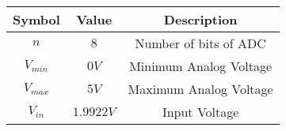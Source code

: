 \begin{tabular}{|c|c|c|}
    \hline
       \textbf{Symbol}  & \textbf{Value} & \textbf{Description}\\
    \hline
        $n$  &  $8$ &  Number of bits of ADC\\
    \hline
        $V_{min}$ & $0V$ & Minimum Analog Voltage\\
    \hline
        $V_{max}$ & $5V$ & Maximum Analog Voltage\\
    \hline
        $V_{in}$ & $1.9922 V$ & Input Voltage\\
    \hline
\end{tabular}
